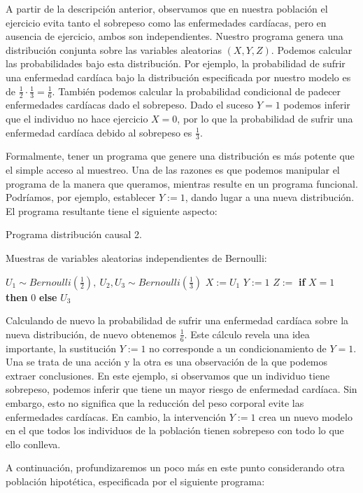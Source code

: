 \documentclass[oneside,openright,titlepage,numbers=noenddot,openany,headinclude,footinclude=true,
cleardoublepage=empty,abstractoff,BCOR=5mm,paper=a4,fontsize=12pt,main=spanish]{scrreprt}
\begin{document}
A partir de la descripción anterior, observamos que en nuestra población el ejercicio evita tanto el sobrepeso como las enfermedades cardíacas, pero en ausencia de ejercicio, ambos son independientes. Nuestro programa genera una distribución conjunta sobre las variables aleatorias $(X, Y, Z)$. Podemos calcular las probabilidades bajo esta distribución. Por ejemplo, la probabilidad de sufrir una enfermedad cardíaca bajo la distribución especificada por nuestro modelo es de $\frac{1}{2}\cdot \frac{1}{3}=\frac{1}{6}$. También podemos calcular la probabilidad condicional de padecer enfermedades cardíacas dado el sobrepeso. Dado el suceso $Y = 1$ podemos inferir que el individuo no hace ejercicio $X=0$, por lo que la probabilidad de sufrir una enfermedad cardíaca debido al sobrepeso es $\frac{1}{3}$.

Formalmente, tener un programa que genere una distribución es más potente que el simple acceso al muestreo. Una de las razones es que podemos manipular el programa de la manera que queramos, mientras resulte en un programa funcional. Podríamos, por ejemplo, establecer $Y := 1$, dando lugar a una nueva distribución. El programa resultante tiene el siguiente aspecto:

\begin{algorithm}[h]
\caption{Programa distribución causal 2.}
    Muestras de variables aleatorias independientes de Bernoulli:
    
    $U_1 \sim  Bernoulli\left(\frac{1}{2}\right), \ U_2,U_3 \sim  Bernoulli\left(\frac{1}{3}\right)$\;
    $X:=U_1$\;
    $Y:=1$\;
    $Z:=$ \textbf{if} $X=1$ \textbf{then} $0$ \textbf{else} $U_3$\;
\end{algorithm}

Calculando de nuevo la probabilidad de sufrir una enfermedad cardíaca sobre la nueva distribución, de nuevo obtenemos $\frac{1}{6}$. Este cálculo revela una idea importante, la sustitución $Y := 1$ no corresponde a un condicionamiento de $Y = 1$. Una se trata de una acción y la otra es una observación de la que podemos extraer conclusiones. En este ejemplo, si observamos que un individuo tiene sobrepeso, podemos inferir que tiene un mayor riesgo de enfermedad cardíaca. Sin embargo, esto no significa que la reducción del peso corporal evite las enfermedades cardíacas. En cambio, la intervención $Y := 1$ crea un nuevo modelo en el que todos los individuos de la población tienen sobrepeso con todo lo que ello conlleva.

A continuación, profundizaremos un poco más en este punto considerando otra población hipotética, especificada por el siguiente programa:
\end{document}
